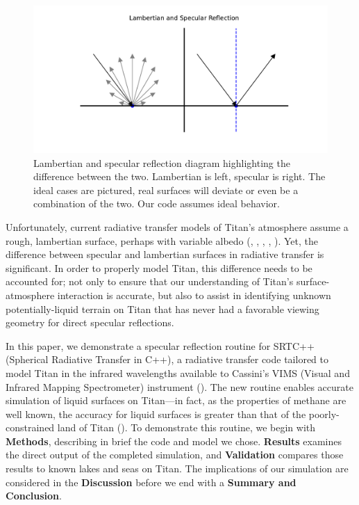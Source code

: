 \documentclass[linenumbers]{aastex631}
\begin{document}
\begin{figure}[htbp]
\centering
\includegraphics[scale = 0.55]{LambertSpec.pdf}
\centering
\caption{Lambertian and specular reflection diagram highlighting the difference between the two. Lambertian is left, specular is right. The ideal cases are pictured, real surfaces will deviate or even be a combination of the two. Our code assumes ideal behavior.}
\label{fig:1}
\end{figure}


Unfortunately, current radiative transfer models of Titan's atmosphere assume a rough, lambertian surface, perhaps with variable albedo (\cite{Griffith2012}, \cite{Xu2013}, \cite{Corlies2021}, \cite{Rannou2021}, \cite{EsSayeh2023}). Yet, the difference between specular and lambertian surfaces in radiative transfer is significant. In order to properly model Titan, this difference needs to be accounted for; not only to ensure that our understanding of Titan's surface-atmosphere interaction is accurate, but also to assist in identifying unknown potentially-liquid terrain on Titan that has never had a favorable viewing geometry for direct specular reflections. 

In this paper, we demonstrate a specular reflection routine for SRTC++ (Spherical Radiative Transfer in C++), a radiative transfer code tailored to model Titan in the infrared wavelengths available to Cassini's VIMS (Visual and Infrared Mapping Spectrometer) instrument (\cite{Barnes2018}). The new routine enables accurate simulation of liquid surfaces on Titan---in fact, as the properties of methane are well known, the accuracy for liquid surfaces is greater than that of the poorly-constrained land of Titan (\cite{Trainer2018}). To demonstrate this routine, we begin with \textbf{Methods}, describing in brief the code and model we chose. \textbf{Results} examines the direct output of the completed simulation, and \textbf{Validation} compares those results to known lakes and seas on Titan. The implications of our simulation are considered in the \textbf{Discussion} before we end with a \textbf{Summary and Conclusion}.
\end{document}
